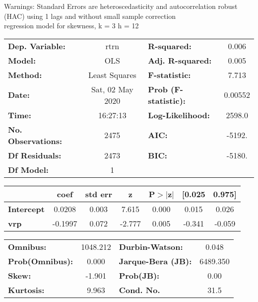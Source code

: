 Warnings: \newline
 [1] Standard Errors are heteroscedasticity and autocorrelation robust (HAC) using 1 lags and without small sample correction\\ 

regression model for skewness, k = 3 h = 12\begin{center}
\begin{tabular}{lclc}
\toprule
\textbf{Dep. Variable:}    &       rtrn       & \textbf{  R-squared:         } &     0.006   \\
\textbf{Model:}            &       OLS        & \textbf{  Adj. R-squared:    } &     0.005   \\
\textbf{Method:}           &  Least Squares   & \textbf{  F-statistic:       } &     7.713   \\
\textbf{Date:}             & Sat, 02 May 2020 & \textbf{  Prob (F-statistic):} &  0.00552    \\
\textbf{Time:}             &     16:27:13     & \textbf{  Log-Likelihood:    } &    2598.0   \\
\textbf{No. Observations:} &        2475      & \textbf{  AIC:               } &    -5192.   \\
\textbf{Df Residuals:}     &        2473      & \textbf{  BIC:               } &    -5180.   \\
\textbf{Df Model:}         &           1      & \textbf{                     } &             \\
\bottomrule
\end{tabular}
\begin{tabular}{lcccccc}
                   & \textbf{coef} & \textbf{std err} & \textbf{z} & \textbf{P$> |$z$|$} & \textbf{[0.025} & \textbf{0.975]}  \\
\midrule
\textbf{Intercept} &       0.0208  &        0.003     &     7.615  &         0.000        &        0.015    &        0.026     \\
\textbf{vrp}       &      -0.1997  &        0.072     &    -2.777  &         0.005        &       -0.341    &       -0.059     \\
\bottomrule
\end{tabular}
\begin{tabular}{lclc}
\textbf{Omnibus:}       & 1048.212 & \textbf{  Durbin-Watson:     } &    0.048  \\
\textbf{Prob(Omnibus):} &   0.000  & \textbf{  Jarque-Bera (JB):  } & 6489.350  \\
\textbf{Skew:}          &  -1.901  & \textbf{  Prob(JB):          } &     0.00  \\
\textbf{Kurtosis:}      &   9.963  & \textbf{  Cond. No.          } &     31.5  \\
\bottomrule
\end{tabular}
\end{center}

